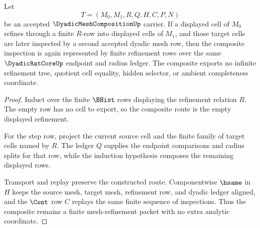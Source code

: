 \begin{theorem}
\label{thm:dyadic-mesh-composition-refinement-transitivity}
Let
$$
T=(M_0,M_1,R,Q,H,C,P,N)
$$
be an accepted $\DyadicMeshCompositionUp$ carrier. If a displayed cell of $M_0$ refines through a finite $R$-row into displayed cells of $M_1$, and those target cells are later inspected by a second accepted dyadic mesh row, then the composite inspection is again represented by finite refinement rows over the same $\DyadicRatCoreUp$ endpoint and radius ledger. The composite exports no infinite refinement tree, quotient cell equality, hidden selector, or ambient completeness coordinate.
\end{theorem}
\begin{proof}
Induct over the finite $\BHist$ rows displaying the refinement relation $R$. The empty row has no cell to export, so the composite route is the empty displayed refinement.

For the step row, project the current source cell and the finite family of target cells named by $R$. The ledger $Q$ supplies the endpoint comparisons and radius splits for that row, while the induction hypothesis composes the remaining displayed rows.

Transport and replay preserve the constructed route. Componentwise $\hsame$ in $H$ keeps the source mesh, target mesh, refinement row, and dyadic ledger aligned, and the $\Cont$ row $C$ replays the same finite sequence of inspections. Thus the composite remains a finite mesh-refinement packet with no extra analytic coordinate.
\end{proof}

